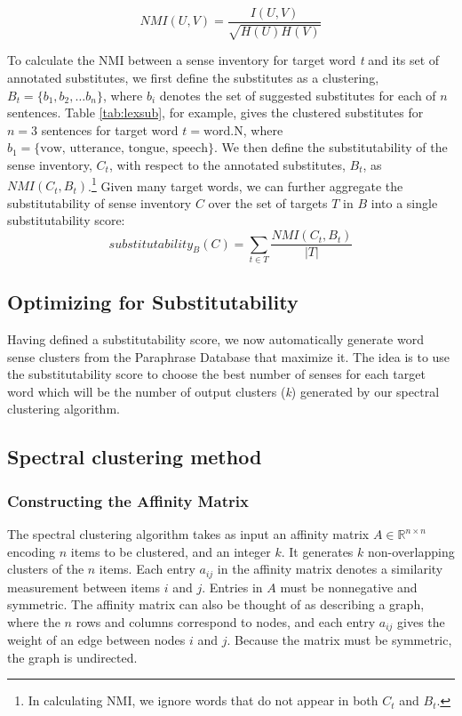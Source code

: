 \documentclass[11pt]{article}
\begin{document}
	
	\[NMI(U,V) = \frac{I(U,V)}{\sqrt{H(U)H(V)}}\]
	
	\noindent To calculate the NMI between a sense inventory for target word \textit{t} and its set of annotated substitutes, we first define the substitutes as a clustering, $B_t = \{b_1, b_2, \dots b_n\}$, where $b_i$ denotes the set of suggested substitutes for each of $n$ sentences. Table \ref{tab:lexsub}, for example, gives the clustered substitutes for $n=3$ sentences for target word $t=\text{word.N}$, where $b_1 = \{\text{vow, utterance, tongue, speech}\}$. We then define the substitutability of the sense inventory, $C_t$, with respect to the annotated substitutes, $B_t$, as $NMI(C_t, B_t)$.\footnote{In calculating NMI, we ignore words that do not appear in both $C_t$ and $B_t$.} Given many target words, we can further aggregate the substitutability of sense inventory $C$ over the set of targets $T$ in $B$ into a single substitutability score:
	\[substitutability_B(C) = \sum_{t \in T} \frac{NMI(C_t, B_t)}{|T|}\]
	
	\subsection{Optimizing for Substitutability}
	\label{optim}
	
	Having defined a substitutability score, we now automatically generate word sense clusters from the Paraphrase Database that maximize it. The idea is to use the substitutability score to choose the best number of senses for each target word which will be the number of output clusters (\textit{k}) generated by our spectral clustering algorithm. 
	
	\subsection{Spectral clustering method}
	\subsubsection{Constructing the Affinity Matrix}
	
	The spectral clustering algorithm \cite{yu2003multiclass} takes as input an affinity matrix $A \in \mathbb{R}^{n\times n}$ encoding $n$ items to be clustered, and an integer $k$. It generates $k$ non-overlapping clusters of the $n$ items. Each entry $a_{ij}$ in the affinity matrix denotes a similarity measurement between items $i$ and $j$. Entries in $A$ must be nonnegative and symmetric. The affinity matrix can also be thought of as describing a graph, where the $n$ rows and columns correspond to nodes, and each entry $a_{ij}$ gives the weight of an edge between nodes $i$ and $j$. Because the matrix must be symmetric, the graph is undirected.
	
\end{document}
